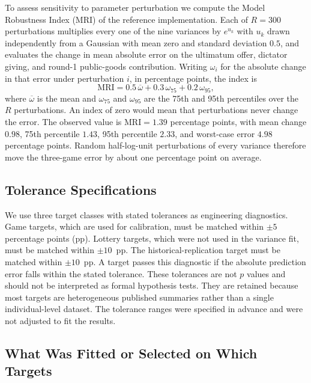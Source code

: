 \documentclass[journal]{IEEEtran}
\begin{document}
To assess sensitivity to parameter perturbation we compute the Model Robustness Index (MRI) of the reference implementation.
Each of $R=300$ perturbations multiplies every one of the nine variances by $e^{u_k}$ with $u_k$ drawn independently from a Gaussian with mean zero and standard deviation $0.5$, and evaluates the change in mean absolute error on the ultimatum offer, dictator giving, and round-1 public-goods contribution.
Writing $\omega_i$ for the absolute change in that error under perturbation $i$, in percentage points, the index is
\begin{equation}
    \mathrm{MRI} = 0.5\,\overline{\omega} + 0.3\,\omega_{75} + 0.2\,\omega_{95},
    \label{eq:mri}
\end{equation}
where $\overline{\omega}$ is the mean and $\omega_{75}$ and $\omega_{95}$ are the 75th and 95th percentiles over the $R$ perturbations.
An index of zero would mean that perturbations never change the error.
The observed value is $\mathrm{MRI}=1.39$ percentage points, with mean change $0.98$, 75th percentile $1.43$, 95th percentile $2.33$, and worst-case error $4.98$ percentage points.
Random half-log-unit perturbations of every variance therefore move the three-game error by about one percentage point on average.


\subsection{Tolerance Specifications}

We use three target classes with stated tolerances as engineering diagnostics.
Game targets, which are used for calibration, must be matched within $\pm5$ percentage points (pp).
Lottery targets, which were not used in the variance fit, must be matched within $\pm10$~pp.
The historical-replication target must be matched within $\pm10$~pp.
A target passes this diagnostic if the absolute prediction error falls within the stated tolerance.
These tolerances are not $p$ values and should not be interpreted as formal hypothesis tests.
They are retained because most targets are heterogeneous published summaries rather than a single individual-level dataset.
The tolerance ranges were specified in advance and were not adjusted to fit the results.

\subsection{What Was Fitted or Selected on Which Targets}
\label{sec:heldout}
\end{document}
